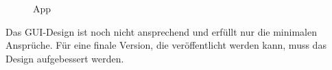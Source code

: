 \begin{figure}[H]
\hfill
{}
\hfill
{}
\caption{\kort{} App}
\label{image-kort-screenshots}
\end{figure}

Das \gls{GUI}-Design ist noch nicht ansprechend und erfüllt nur die minimalen Ansprüche.
Für eine finale Version, die veröffentlicht werden kann, muss das Design aufgebessert werden.

